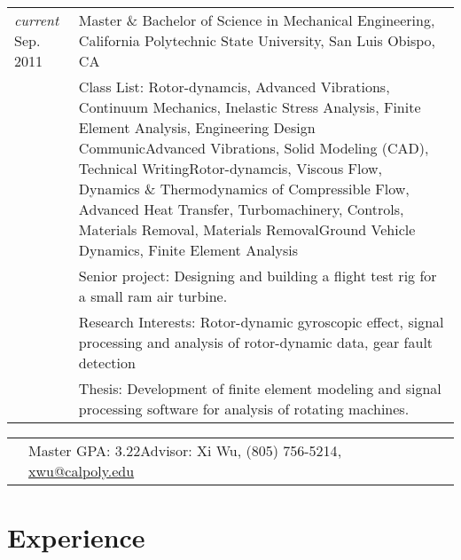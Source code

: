 \documentclass[10pt]{article} %
\newcommand{\secspace}{.25em}
\begin{document}
\begin{tabular}{p{.6in}|p{5.5in}}	
	\emph{current} Sep. 2011 & Master \& Bachelor of Science in Mechanical Engineering,  California Polytechnic State University, San Luis Obispo, CA\\
	& \footnotesize{Class List: Rotor-dynamcis, Advanced Vibrations, Continuum Mechanics, Inelastic Stress Analysis, Finite Element Analysis, Engineering Design CommunicAdvanced Vibrations, Solid Modeling (CAD), Technical WritingRotor-dynamcis, Viscous Flow, Dynamics \& Thermodynamics of Compressible Flow, Advanced Heat Transfer, Turbomachinery, Controls, Materials Removal, Materials RemovalGround Vehicle Dynamics, Finite Element Analysis}\\
	& \footnotesize{Senior project: Designing and building a flight test rig for a small ram air turbine.}\\
	& \footnotesize{Research Interests: Rotor-dynamic gyroscopic effect, signal processing and analysis of rotor-dynamic data, gear fault detection}\\
	& \footnotesize{Thesis: Development of finite element modeling and signal processing software for analysis of rotating machines.}\\
\end{tabular}\par \vspace{-.5em}
\begin{tabular}{p{.6in}p{5.5in}}	
	&\footnotesize{Master GPA: 3.22\hfill  Advisor: Xi Wu, (805) 756-5214}, \href{mailto:xwu@calpoly.edu}{xwu@calpoly.edu}\\[\secspace]
\end{tabular}



\section{Experience}
\end{document}
